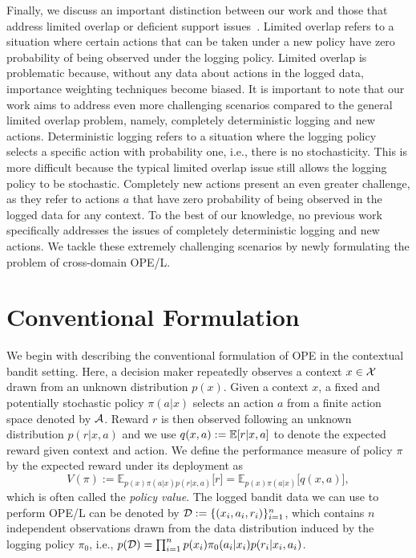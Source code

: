 \documentclass{article} %
\theoremstyle{definition}
\begin{document}
Finally, we discuss an important distinction between our work and those that address limited overlap or deficient support issues~\citep{hansen2008prognostic,sachdeva2020off,wu2021beta,felicioni2022off}. Limited overlap refers to a situation where certain actions that can be taken under a new policy have zero probability of being observed under the logging policy. Limited overlap is problematic because, without any data about actions in the logged data, importance weighting techniques become biased. It is important to note that our work aims to address even more challenging scenarios compared to the general limited overlap problem, namely, completely deterministic logging and new actions. Deterministic logging refers to a situation where the logging policy selects a specific action with probability one, i.e., there is no stochasticity. This is more difficult because the typical limited overlap issue still allows the logging policy to be stochastic. Completely new actions present an even greater challenge, as they refer to actions $a$ that have zero probability of being observed in the logged data for any context. To the best of our knowledge, no previous work specifically addresses the issues of completely deterministic logging and new actions. We tackle these extremely challenging scenarios by newly formulating the problem of cross-domain OPE/L.


\section{Conventional Formulation} \label{sec:formulation}
We begin with describing the conventional formulation of OPE in the contextual bandit setting. Here, a decision maker repeatedly observes a context $x \in \mathcal{X}$ drawn from an unknown distribution $p(x)$. Given a context $x$, a fixed and potentially stochastic policy $\pi(a|x)$ selects an action $a$ from a finite action space denoted by $\mathcal{A}$. Reward $r$ is then observed following an unknown distribution $p(r |x, a)$ and we use $q(x, a):= \mathbb{E}[r|x,a]$ to denote the expected reward given context and action. We define the performance measure of policy $\pi$ by the expected reward under its deployment as
\begin{equation}
\label{policy value}
    V(\pi):= \mathbb {E}_{p(x)\pi(a|x)p(r|x,a)}\lbrack r\rbrack=\mathbb {E}_{p(x)\pi(a|x)}\lbrack q(x,a)\rbrack,
\end{equation}
which is often called the \textit{policy value}. The logged bandit data we can use to perform OPE/L can be denoted by $\mathcal{D}:=\{(x_i,a_i,r_i)\}^n_{i=1}$, which contains $n$ independent observations drawn from the data distribution induced by the logging policy $\pi_0$, i.e., $p(\mathcal{D}) = \prod_{i=1}^n p(x_i)\pi_0(a_i|x_i)p(r_i|x_i,a_i)$.
\end{document}
